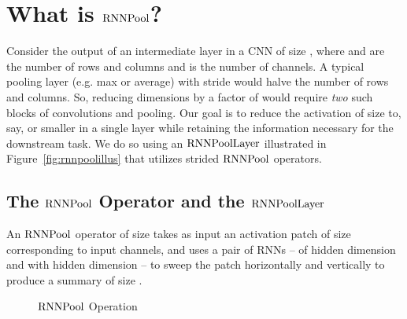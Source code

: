 \documentclass[10pt]{article}
\newcommand{\rpool}{\ensuremath{{\rm RNNPool}}\xspace}
\newcommand{\rpoollayer}{\ensuremath{{\rm RNNPoolLayer}}\xspace}
\begin{document}
 \section{What is \rpool?}
\label{sec:def}

Consider the output of an intermediate layer in a CNN of size , where  and  are the number of rows and columns and
 is the number of channels. A typical  pooling layer
(e.g. max or average) with stride  would halve the number of rows
and columns. So, reducing dimensions by a factor of  would
require {\em two} such blocks of convolutions and pooling. Our goal is to reduce the activation of
size  to, say,  or
smaller in a single layer while retaining the information necessary
for the downstream task. We do so using an \rpoollayer illustrated in
Figure~\ref{fig:rnnpoolillus} that utilizes strided \rpool operators.


\subsection{The \rpool Operator and the \rpoollayer}

An \rpool operator of size  takes as input an
activation patch of size  corresponding to 
input channels, and uses a pair of RNNs --  of hidden
dimension  and  with hidden dimension  -- to
sweep the patch horizontally and vertically to produce a summary of
size .

\begin{wrapfigure}{r}{0.5\columnwidth}
  \begin{minipage}{0.5\columnwidth}
  \vspace{-13pt}
\begin{algorithm}[H]
\caption{\rpool Operation}
\label{alg:rpool}
\small
\begin{algorithmic}[1]
\Require{} 
\Ensure{}
\Statex
\Function{}{}
    \State{,   } 
        \State{  }
        \State{  }
        \State{  }
    \EndFor
    \State \Return {}
\EndFunction
\Statex
{}




\Function{\rpool}{}



 \label{lst:line:1}
      


    \State{  } \label{lst:line:2}
    
    \State{  ,   }  \label{lst:line:3}
    
    \Statex
      
\label{lst:line:4}
      


    \State{  }\label{lst:line:5}
        
    \State{  ,   }
        \label{lst:line:6}
      
    \Statex

    \State \Return {}
\EndFunction
\end{algorithmic}
\end{algorithm}
\vspace{-35pt}
\end{minipage}
\end{wrapfigure}
 
\end{document}
